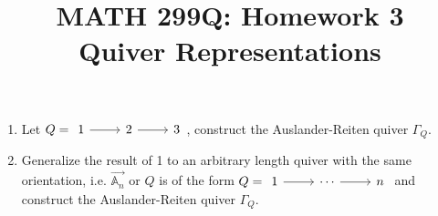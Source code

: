 \documentclass{article}
\title{MATH 299Q: Homework 3\\{\Large Quiver Representations}}
\author{}
\date{}
\theoremstyle{plain}
\theoremstyle{definition}
\theoremstyle{remark}
\numberwithin{equation}{section}
\begin{document}
\maketitle

\begin{enumerate}[1.]
    \item Let $Q=\begin{tikzcd}1\arrow[r]&2\arrow[r]&3\end{tikzcd}$, construct the Auslander-Reiten quiver $\Gamma_Q$.
    \vfill
    \item Generalize the result of 1 to an arbitrary length quiver with the same orientation, i.e. $\overrightarrow{\mathbb{A}_n}$ or $Q$ is of the form $Q=\begin{tikzcd}1\arrow[r]&\cdots\arrow[r]&n\end{tikzcd}$ and construct the Auslander-Reiten quiver $\Gamma_Q$.
    \vfill
\end{enumerate}
\end{document}
